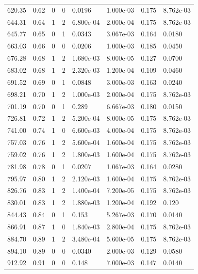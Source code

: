\documentclass[preview]{standalone}
\begin{document}
{{{\begin{tabular}{L{1.2cm}C{1.2cm} C{0.3cm}C{0.5cm} C{1.4cm}C{1.4cm} C{1.4cm}C{1.4cm}}
  620.35  &  0.62  & 0     &  0 &  0.0196  & 1.000e-03  & 0.175 &  8.762e-03   \\ 
  644.31  &  0.64  & 1     &  2 &  6.800e-04  & 2.000e-04  & 0.175 &  8.762e-03   \\ 
  645.77  &  0.65  & 0     &  1 &  0.0343  & 3.067e-03  & 0.164 &  0.0180   \\ 
  663.03  &  0.66  & 0     &  0 &  0.0206  & 1.000e-03  & 0.185 &  0.0450   \\ 
  676.28  &  0.68  & 1     &  2 &  1.680e-03  & 8.000e-05  & 0.127 &  0.0700   \\ 
  683.02  &  0.68  & 1     &  2 &  2.320e-03  & 1.200e-04  & 0.109 &  0.0460   \\ 
  691.52  &  0.69  & 0     &  1 &  0.0848  & 3.000e-03  & 0.163 &  0.0240   \\ 
  698.21  &  0.70  & 1     &  2 &  1.000e-03  & 2.000e-04  & 0.175 &  8.762e-03   \\ 
  701.19  &  0.70  & 0     &  1 &  0.289  & 6.667e-03  & 0.180 &  0.0150   \\ 
  726.81  &  0.72  & 1     &  2 &  5.200e-04  & 8.000e-05  & 0.175 &  8.762e-03   \\ 
  741.00  &  0.74  & 1     &  0 &  6.600e-03  & 4.000e-04  & 0.175 &  8.762e-03   \\ 
  757.03  &  0.76  & 1     &  2 &  5.600e-04  & 1.600e-04  & 0.175 &  8.762e-03   \\ 
  759.02  &  0.76  & 1     &  2 &  1.800e-03  & 1.600e-04  & 0.175 &  8.762e-03   \\ 
  781.98  &  0.78  & 0     &  1 &  0.0207  & 1.067e-03  & 0.164 &  0.0280   \\ 
  795.97  &  0.80  & 1     &  2 &  2.120e-03  & 1.600e-04  & 0.175 &  8.762e-03   \\ 
  826.76  &  0.83  & 1     &  2 &  1.400e-04  & 7.200e-05  & 0.175 &  8.762e-03   \\ 
  830.01  &  0.83  & 1     &  2 &  1.880e-03  & 1.200e-04  & 0.192 &  0.120   \\ 
  844.43  &  0.84  & 0     &  1 &  0.153  & 5.267e-03  & 0.170 &  0.0140   \\ 
  866.91  &  0.87  & 1     &  0 &  1.840e-03  & 2.800e-04  & 0.175 &  8.762e-03   \\ 
  884.70  &  0.89  & 1     &  2 &  3.480e-04  & 5.600e-05  & 0.175 &  8.762e-03   \\ 
  894.10  &  0.89  & 0     &  0 &  0.0340  & 2.000e-03  & 0.129 &  0.0580   \\ 
  912.92  &  0.91  & 0     &  0 &  0.148  & 7.000e-03  & 0.147 &  0.0140   \\ 

\end{tabular}}}}
\end{document}
